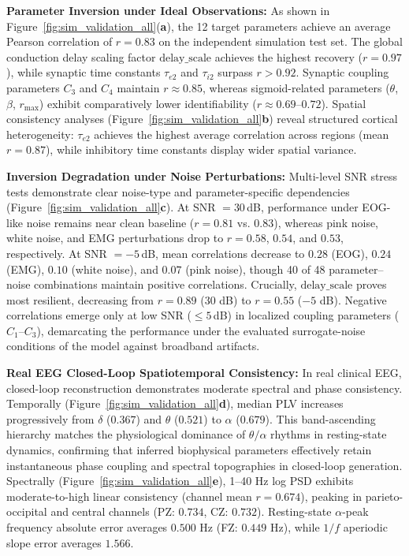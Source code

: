 \documentclass{article}
\begin{document}
{\textbf{Parameter Inversion under Ideal Observations:} As shown in Figure~\ref{fig:sim_validation_all}(\textbf{a}), the 12 target parameters achieve an average Pearson correlation of $r = 0.83$ on the independent simulation test set. The global conduction delay scaling factor $\mathrm{delay\_scale}$ achieves the highest recovery ($r = 0.97$), while synaptic time constants $\tau_{e2}$ and $\tau_{i2}$ surpass $r > 0.92$. Synaptic coupling parameters $C_3$ and $C_4$ maintain $r \approx 0.85$, whereas sigmoid-related parameters ($\theta$, $\beta$, $r_{\max}$) exhibit comparatively lower identifiability ($r \approx 0.69\text{--}0.72$). Spatial consistency analyses (Figure~\ref{fig:sim_validation_all}\textbf{b}) reveal structured cortical heterogeneity: $\tau_{e2}$ achieves the highest average correlation across regions (mean $r = 0.87$), while inhibitory time constants display wider spatial variance.

\textbf{Inversion Degradation under Noise Perturbations:} Multi-level SNR stress tests demonstrate clear noise-type and parameter-specific dependencies (Figure~\ref{fig:sim_validation_all}\textbf{c}). At SNR $=30$\,dB, performance under EOG-like noise remains near clean baseline ($r = 0.81$ vs. $0.83$), whereas pink noise, white noise, and EMG perturbations drop to $r = 0.58$, $0.54$, and $0.53$, respectively. At SNR $=-5$\,dB, mean correlations decrease to $0.28$ (EOG), $0.24$ (EMG), $0.10$ (white noise), and $0.07$ (pink noise), though 40 of 48 parameter--noise combinations maintain positive correlations. Crucially, $\mathrm{delay\_scale}$ proves most resilient, decreasing from $r = 0.89$ (30 dB) to $r = 0.55$ ($-5$ dB). Negative correlations emerge only at low SNR ($\leq 5$\,dB) in localized coupling parameters ($C_1$--$C_3$), demarcating the performance under the evaluated surrogate-noise conditions of the model against broadband artifacts.

\textbf{Real EEG Closed-Loop Spatiotemporal Consistency:} In real clinical EEG, closed-loop reconstruction demonstrates moderate spectral and phase consistency. Temporally (Figure~\ref{fig:sim_validation_all}\textbf{d}), median PLV increases progressively from $\delta$ ($0.367$) and $\theta$ ($0.521$) to $\alpha$ ($0.679$). This band-ascending hierarchy matches the physiological dominance of $\theta/\alpha$ rhythms in resting-state dynamics, confirming that inferred biophysical parameters effectively retain instantaneous phase coupling and spectral topographies in closed-loop generation. Spectrally (Figure~\ref{fig:sim_validation_all}\textbf{e}), 1--40 Hz log PSD exhibits moderate-to-high linear consistency (channel mean $r = 0.674$), peaking in parieto-occipital and central channels (PZ: $0.734$, CZ: $0.732$). Resting-state $\alpha$-peak frequency absolute error averages $0.500$ Hz (FZ: $0.449$ Hz), while $1/f$ aperiodic slope error averages $1.566$. 

}
\end{document}
